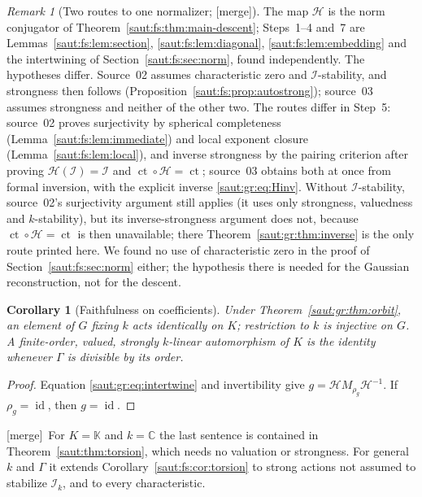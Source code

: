\documentclass[11pt]{article}
\newtheorem{corollary}[theorem]{Corollary}
\theoremstyle{definition}
\theoremstyle{remark}
\newtheorem{remark}[theorem]{Remark}
\newcommand{\C}{\mathbb C}
\newcommand{\K}{\mathbb K}
\newcommand{\id}{\operatorname{id}}
\newcommand{\ct}{\operatorname{ct}}
\newcommand{\Ineg}{\mathcal I}
\newcommand{\mergetag}{\textup{[merge]}}
\numberwithin{equation}{section}
\begin{document}
\begin{remark}[Two routes to one normalizer; \mergetag]\label{saut:gr:rem:routes}
The map $\mathcal H$ is the norm conjugator of Theorem~\ref{saut:fs:thm:main-descent};
Steps~1--4 and~7 are Lemmas~\ref{saut:fs:lem:section}, \ref{saut:fs:lem:diagonal},
\ref{saut:fs:lem:embedding} and the intertwining of Section~\ref{saut:fs:sec:norm},
found independently. The hypotheses differ. Source~02 assumes characteristic zero and
$\Ineg$-stability, and strongness then follows
(Proposition~\ref{saut:fs:prop:autostrong}); source~03 assumes strongness and neither
of the other two. The routes differ in Step~5: source~02 proves surjectivity by
spherical completeness (Lemma~\ref{saut:fs:lem:immediate}) and local exponent closure
(Lemma~\ref{saut:fs:lem:local}), and inverse strongness by the pairing criterion after
proving $\mathcal H(\Ineg)=\Ineg$ and $\ct\circ\mathcal H=\ct$; source~03 obtains both at
once from formal inversion, with the explicit inverse \eqref{saut:gr:eq:Hinv}. Without
$\Ineg$-stability, source~02's surjectivity argument still applies (it uses only
strongness, valuedness and $k$-stability), but its inverse-strongness argument does
not, because $\ct\circ\mathcal H=\ct$ is then unavailable; there
Theorem~\ref{saut:gr:thm:inverse} is the only route printed here. We found no use of
characteristic zero in the proof of Section~\ref{saut:fs:sec:norm} either; the
hypothesis there is needed for the Gaussian reconstruction, not for the descent.
\end{remark}

\begin{corollary}[Faithfulness on coefficients]\label{saut:gr:cor:faithful}
Under Theorem~\ref{saut:gr:thm:orbit}, an element of $G$ fixing $k$ acts identically on
$K$; restriction to $k$ is injective on $G$. A finite-order, valued, strongly
$k$-linear automorphism of $K$ is the identity whenever $\Gamma$ is divisible by its
order.
\end{corollary}
\begin{proof}
Equation \eqref{saut:gr:eq:intertwine} and invertibility give $g=\mathcal HM_{\rho_g}
\mathcal H^{-1}$. If $\rho_g=\id$, then $g=\id$.
\end{proof}

\mergetag\ For $K=\K$ and $k=\C$ the last sentence is contained in
Theorem~\ref{saut:thm:torsion}, which needs no valuation or strongness. For general
$k$ and $\Gamma$ it extends Corollary~\ref{saut:fs:cor:torsion} to strong actions not
assumed to stabilize $\Ineg_k$, and to every characteristic.
\end{document}
